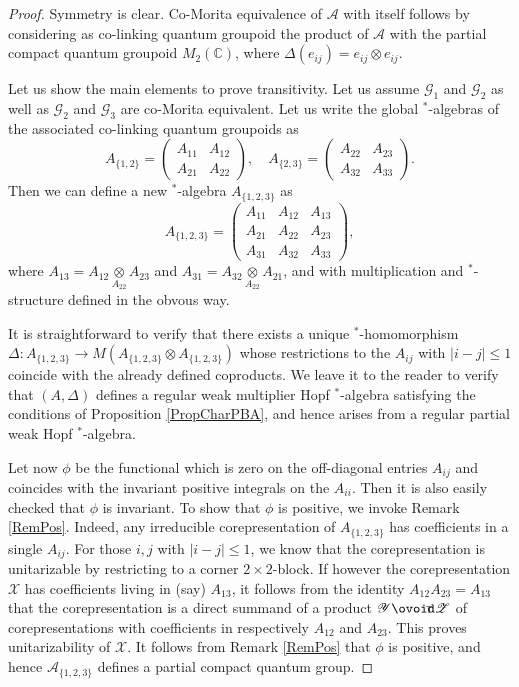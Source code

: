 \documentclass[10pt]{article}
\newcommand{\Circt}{{\mathop{\ooalign{$\ovoid$\cr\hidewidth\raise-.05ex\hbox{$\scriptstyle\mathsf T\mkern3.5mu$}\cr}}}} %
\newcommand{\C}{\mathbb{C}}
\theoremstyle{definition}
\numberwithin{equation}{section}
\begin{document}
\begin{proof} Symmetry is clear. Co-Morita equivalence of $\mathscr{A}$ with itself follows by considering as co-linking quantum groupoid the product of $\mathscr{A}$ with the partial compact quantum groupoid $M_2(\C)$, where $\Delta(e_{ij}) = e_{ij}\otimes e_{ij}$. 

Let us show the main elements to prove transitivity. Let us assume $\mathscr{G}_1$ and $\mathscr{G}_2$ as well as $\mathscr{G}_2$ and $\mathscr{G}_3$ are co-Morita equivalent. Let us write the global $^*$-algebras of the associated co-linking quantum groupoids as \[A_{\{1,2\}} = \begin{pmatrix} A_{11} & A_{12} \\ A_{21} & A_{22} \end{pmatrix}, \quad A_{\{2,3\}} = \begin{pmatrix} A_{22} & A_{23} \\ A_{32} & A_{33}\end{pmatrix}.\] Then we can define a new $^*$-algebra $A_{\{1,2,3\}}$ as \[ A_{\{1,2,3\}} = \begin{pmatrix} A_{11} & A_{12} &   A_{13} \\ A_{21} & A_{22} & A_{23} \\ A_{31} & A_{32} & A_{33} \end{pmatrix},\] where $A_{13} = A_{12}\underset{A_{22}}{\otimes } A_{23}$ and $A_{31} = A_{32}\underset{A_{22}}{\otimes} A_{21}$, and with multiplication and $^*$-structure defined in the obvous way. 

It is straightforward to verify that there exists a unique $^*$-homomorphism $\Delta: A_{\{1,2,3\}} \rightarrow M(A_{\{1,2,3\}}\otimes A_{\{1,2,3\}})$ whose restrictions to the $A_{ij}$ with $|i-j|\leq 1$ coincide with the already defined coproducts. We leave it to the reader to verify that $(A,\Delta)$ defines a regular weak multiplier Hopf $^*$-algebra satisfying the conditions of Proposition \ref{PropCharPBA}, and hence arises from a regular partial weak Hopf $^*$-algebra. 

Let now $\phi$ be the functional which is zero on the off-diagonal entries $A_{ij}$ and coincides with the invariant positive integrals on the $A_{ii}$. Then it is also easily checked that $\phi$ is invariant. To show that $\phi$ is positive, we invoke Remark \ref{RemPos}. Indeed, any irreducible corepresentation of $A_{\{1,2,3\}}$ has coefficients in a single $A_{ij}$. For those $i,j$ with $|i-j|\leq 1$, we know that the corepresentation is unitarizable by restricting to a corner $2\times 2$-block. If however the corepresentation $\mathscr{X}$ has coefficients living in (say) $A_{13}$, it follows from the identity $A_{12}A_{23}=A_{13}$ that the corepresentation is a direct summand of a product $\mathscr{Y}\Circt \mathscr{Z}$ of corepresentations with coefficients in respectively $A_{12}$ and $A_{23}$. This proves unitarizability of $\mathscr{X}$. It follows from Remark \ref{RemPos} that $\phi$ is positive, and hence $\mathscr{A}_{\{1,2,3\}}$ defines a partial compact quantum group.  


\end{proof}
\end{document}
